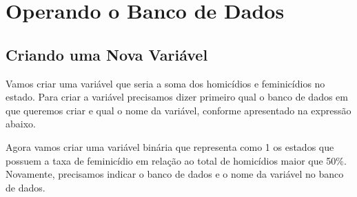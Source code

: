 \documentclass[
  letterpaper,
  DIV=11,
  numbers=noendperiod]{scrreprt}
\newenvironment{Shaded}{\begin{snugshade}}{\end{snugshade}}
\newcommand{\AttributeTok}[1]{\textcolor[rgb]{0.40,0.45,0.13}{#1}}
\newcommand{\DecValTok}[1]{\textcolor[rgb]{0.68,0.00,0.00}{#1}}
\newcommand{\FunctionTok}[1]{\textcolor[rgb]{0.28,0.35,0.67}{#1}}
\newcommand{\NormalTok}[1]{\textcolor[rgb]{0.00,0.23,0.31}{#1}}
\newcommand{\OtherTok}[1]{\textcolor[rgb]{0.00,0.23,0.31}{#1}}
\newcommand{\SpecialCharTok}[1]{\textcolor[rgb]{0.37,0.37,0.37}{#1}}
\newcommand{\StringTok}[1]{\textcolor[rgb]{0.13,0.47,0.30}{#1}}
\begin{document}
\section{Operando o Banco de Dados}\label{operando-o-banco-de-dados}

\subsection{Criando uma Nova
Variável}\label{criando-uma-nova-variuxe1vel}

Vamos criar uma variável que seria a soma dos homicídios e feminicídios
no estado. Para criar a variável precisamos dizer primeiro qual o banco
de dados em que queremos criar e qual o nome da variável, conforme
apresentado na expressão abaixo.

\begin{Shaded}
\end{Shaded}

Agora vamos criar uma variável binária que representa como 1 os estados
que possuem a taxa de feminicídio em relação ao total de homicídios
maior que 50\%. Novamente, precisamos indicar o banco de dados e o nome
da variável no banco de dados.

\begin{Shaded}
\end{Shaded}
\end{document}
